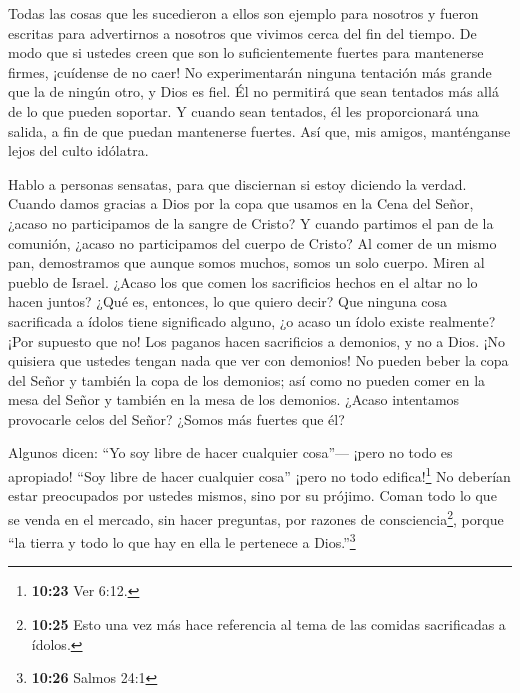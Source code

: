  Todas las cosas que les sucedieron a ellos son ejemplo
para nosotros y fueron escritas para advertirnos a nosotros que vivimos
cerca del fin del tiempo.  De modo que si ustedes creen que
son lo suficientemente fuertes para mantenerse firmes, ¡cuídense de no
caer!  No experimentarán ninguna tentación más grande que
la de ningún otro, y Dios es fiel. Él no permitirá que sean tentados más
allá de lo que pueden soportar. Y cuando sean tentados, él les
proporcionará una salida, a fin de que puedan mantenerse fuertes.
 Así que, mis amigos, manténganse lejos del culto idólatra.

 Hablo a personas sensatas, para que disciernan si estoy
diciendo la verdad.  Cuando damos gracias a Dios por la
copa que usamos en la Cena del Señor, ¿acaso no participamos de la
sangre de Cristo? Y cuando partimos el pan de la comunión, ¿acaso no
participamos del cuerpo de Cristo?  Al comer de un mismo
pan, demostramos que aunque somos muchos, somos un solo cuerpo.
 Miren al pueblo de Israel. ¿Acaso los que comen los
sacrificios hechos en el altar no lo hacen juntos?  ¿Qué
es, entonces, lo que quiero decir? Que ninguna cosa sacrificada a ídolos
tiene significado alguno, ¿o acaso un ídolo existe realmente? ¡Por
supuesto que no!  Los paganos hacen sacrificios a demonios,
y no a Dios. ¡No quisiera que ustedes tengan nada que ver con demonios!
 No pueden beber la copa del Señor y también la copa de los
demonios; así como no pueden comer en la mesa del Señor y también en la
mesa de los demonios.  ¿Acaso intentamos provocarle celos
del Señor? ¿Somos más fuertes que él?

 Algunos dicen: ``Yo soy libre de hacer cualquier cosa''---
¡pero no todo es apropiado! ``Soy libre de hacer cualquier cosa'' ¡pero
no todo edifica!\footnote{\textbf{10:23} Ver 6:12.}  No
deberían estar preocupados por ustedes mismos, sino por su prójimo.
 Coman todo lo que se venda en el mercado, sin hacer
preguntas, por razones de consciencia\footnote{\textbf{10:25} Esto una
  vez más hace referencia al tema de las comidas sacrificadas a ídolos.},
 porque ``la tierra y todo lo que hay en ella le pertenece
a Dios.''\footnote{\textbf{10:26} Salmos 24:1}

